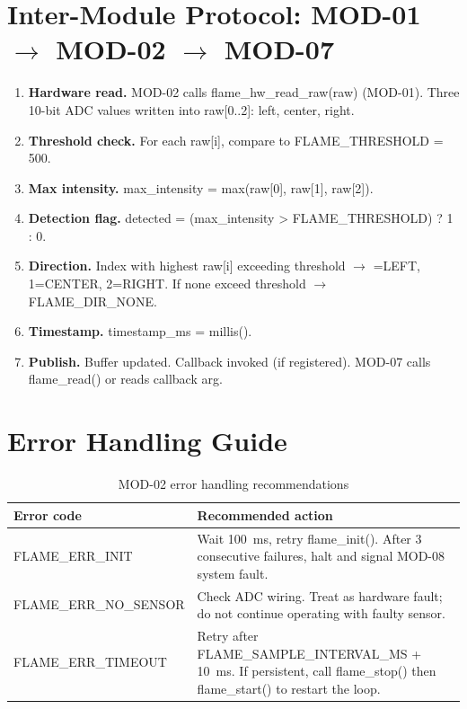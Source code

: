 \documentclass[12pt]{article}
\newcommand{\fn}[1]{{\footnotesize\ttfamily #1}}
\newcommand{\sectionrule}{%
  \vspace{2pt}{\color{headerblue}\rule{\linewidth}{1.5pt}}\vspace{6pt}}
\begin{document}
\section{Inter-Module Protocol: MOD-01 $\rightarrow$ MOD-02 $\rightarrow$ MOD-07}
\sectionrule

\begin{enumerate}[leftmargin=*, label=\textbf{Step \arabic*.}]
  \item \textbf{Hardware read.} MOD-02 calls \fn{flame\_hw\_read\_raw(raw)} (MOD-01). Three 10-bit ADC values written into \fn{raw[0..2]}: left, center, right.
  \item \textbf{Threshold check.} For each \fn{raw[i]}, compare to \fn{FLAME\_THRESHOLD = 500}.
  \item \textbf{Max intensity.} \fn{max\_intensity = max(raw[0], raw[1], raw[2])}.
  \item \textbf{Detection flag.} \fn{detected = (max\_intensity > FLAME\_THRESHOLD) ? 1 : 0}.
  \item \textbf{Direction.} Index with highest \fn{raw[i]} exceeding threshold $\rightarrow$ \fn{0=LEFT, 1=CENTER, 2=RIGHT}. If none exceed threshold $\rightarrow$ \fn{FLAME\_DIR\_NONE}.
  \item \textbf{Timestamp.} \fn{timestamp\_ms = millis()}.
  \item \textbf{Publish.} Buffer updated. Callback invoked (if registered). MOD-07 calls \fn{flame\_read()} or reads callback arg.
\end{enumerate}

\section{Error Handling Guide}
\sectionrule

\begin{table}[H]\centering\small
\begin{tabularx}{\textwidth}{L{4.5cm} X}
\toprule
\textbf{Error code} & \textbf{Recommended action} \\
\midrule
\fn{FLAME\_ERR\_INIT}       & Wait 100~ms, retry \fn{flame\_init()}. After 3 consecutive failures, halt and signal MOD-08 system fault. \\
\fn{FLAME\_ERR\_NO\_SENSOR} & Check ADC wiring. Treat as hardware fault; do not continue operating with faulty sensor. \\
\fn{FLAME\_ERR\_TIMEOUT}    & Retry after \fn{FLAME\_SAMPLE\_INTERVAL\_MS + 10}~ms. If persistent, call \fn{flame\_stop()} then \fn{flame\_start()} to restart the loop. \\
\bottomrule
\end{tabularx}
\caption{MOD-02 error handling recommendations}
\end{table}
\end{document}
